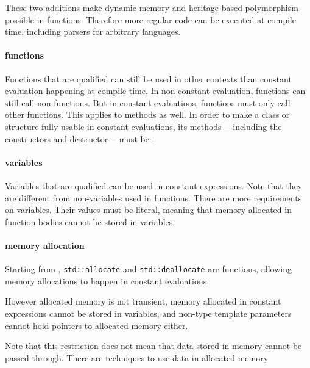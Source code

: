 \documentclass[../main]{subfiles}
\begin{document}
These two additions make dynamic memory and heritage-based polymorphism
possible in \constexpr functions. Therefore more regular \cpp code can be
executed at compile time, including parsers for arbitrary languages.

\paragraph{\constexpr functions} Functions that are \constexpr qualified can
still be used in other contexts than constant evaluation happening at
compile time. In non-constant evaluation, \constexpr functions can still call
non-\constexpr functions. But in constant evaluations, \constexpr functions must
only call other \constexpr functions. This applies to methods as well.
In order to make a \cpp class or structure fully usable in constant evaluations,
its methods ---including the constructors and destructor--- must be \constexpr.

\paragraph{\constexpr variables} Variables that are \constexpr qualified can be
used in constant expressions. Note that they are different from
non-\constexpr variables used in \constexpr functions.
There are more requirements on \constexpr variables.
Their values must be literal, meaning that memory allocated in \constexpr
function bodies cannot be stored in \constexpr variables.

\paragraph{
  \constexpr memory allocation
}
Starting from , \lstinline{std::allocate} and \lstinline{std::deallocate}
are \constexpr functions, allowing memory allocations to happen in
constant evaluations.

However \constexpr allocated memory is not transient, \ie memory allocated in
constant expressions cannot be stored in \constexpr variables, and non-type
template parameters cannot hold pointers to \constexpr allocated memory either.

Note that this restriction does not mean that data stored in \constexpr memory
cannot be passed through. There are techniques to use data in \constexpr
allocated memory
\end{document}
